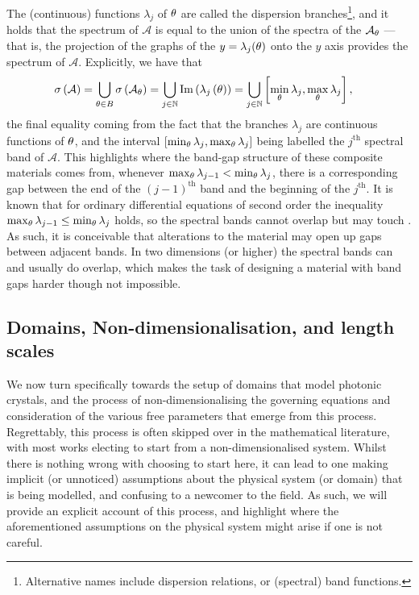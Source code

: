 The (continuous) functions $\lambda_j$ of $\theta$ are called the dispersion branches\footnote{Alternative names include dispersion relations, or (spectral) band functions.}, and it holds that the spectrum of $\mathcal{A}$ is equal to the union of the spectra of the $\mathcal{A}_\theta$ --- that is, the projection of the graphs of the $y=\lambda_j(\theta)$ onto the $y$ axis provides the spectrum of $\mathcal{A}$.
Explicitly, we have that
\begin{align*}
	\sigma\left( \mathcal{A} \right) &= \bigcup_{\theta\in B} \sigma\left( \mathcal{A}_{\theta} \right)
	= \bigcup_{j\in\mathbb{N}} \mathrm{Im}\left( \lambda_j\left( \theta \right) \right)
	= \bigcup_{j\in\mathbb{N}} \left[  \min_{\theta}\lambda_j, \max_{\theta}\lambda_j  \right],
\end{align*}
the final equality coming from the fact that the branches $\lambda_j$ are continuous functions of $\theta$, and the interval $\left[  \min_{\theta}\lambda_j, \max_{\theta}\lambda_j  \right]$ being labelled the $j^{\text{th}}$ spectral band of $\mathcal{A}$.
This highlights where the band-gap structure of these composite materials comes from, whenever $\max_{\theta}\lambda_{j-1} < \min_{\theta}\lambda_{j}$, there is a corresponding gap between the end of the $(j-1)^{\text{th}}$ band and the beginning of the $j^{\text{th}}$.
It is known that for ordinary differential equations of second order the inequality $\max_{\theta}\lambda_{j-1} \leq \min_{\theta}\lambda_{j}$ holds, so the spectral bands cannot overlap but may touch .
As such, it is conceivable that alterations to the material may open up gaps between adjacent bands.
In two dimensions (or higher) the spectral bands can and usually do overlap, which makes the task of designing a material with band gaps harder though not impossible.

\subsection{Domains, Non-dimensionalisation, and length scales}
We now turn specifically towards the setup of domains that model photonic crystals, and the process of non-dimensionalising the governing equations and consideration of the various free parameters that emerge from this process.
Regrettably, this process is often skipped over in the mathematical literature, with most works electing to start from a non-dimensionalised system.
Whilst there is nothing wrong with choosing to start here, it can lead to one making implicit (or unnoticed) assumptions about the physical system (or domain) that is being modelled, and confusing to a newcomer to the field.
As such, we will provide an explicit account of this process, and highlight where the aforementioned assumptions on the physical system might arise if one is not careful.

